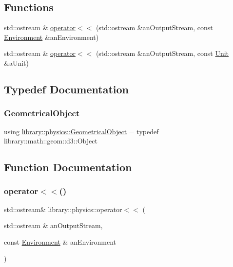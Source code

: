 \subsection*{Functions}
\begin{DoxyCompactItemize}
\item 
std\+::ostream \& \hyperlink{namespacelibrary_1_1physics_a3786f2dadc91182f9f027bf75bb186ce}{operator$<$$<$} (std\+::ostream \&an\+Output\+Stream, const \hyperlink{classlibrary_1_1physics_1_1_environment}{Environment} \&an\+Environment)
\item 
std\+::ostream \& \hyperlink{namespacelibrary_1_1physics_aca17d48f0effeaf867bfdf923ea80576}{operator$<$$<$} (std\+::ostream \&an\+Output\+Stream, const \hyperlink{classlibrary_1_1physics_1_1_unit}{Unit} \&a\+Unit)
\end{DoxyCompactItemize}


\subsection{Typedef Documentation}
\mbox{\label{namespacelibrary_1_1physics_a188a48c84b083aea628a2bd98f6b8e0a}} 
\subsubsection{\texorpdfstring{Geometrical\+Object}{GeometricalObject}}
{\footnotesize\ttfamily using \hyperlink{namespacelibrary_1_1physics_a188a48c84b083aea628a2bd98f6b8e0a}{library\+::physics\+::\+Geometrical\+Object} = typedef library\+::math\+::geom\+::d3\+::\+Object}



\subsection{Function Documentation}
\mbox{\label{namespacelibrary_1_1physics_a3786f2dadc91182f9f027bf75bb186ce}} 
\subsubsection{\texorpdfstring{operator$<$$<$()}{operator<<()}\hspace{0.1cm}{\footnotesize\ttfamily [1/2]}}
{\footnotesize\ttfamily std\+::ostream\& library\+::physics\+::operator$<$$<$ (\begin{DoxyParamCaption}\item[{std\+::ostream \&}]{an\+Output\+Stream,  }\item[{const \hyperlink{classlibrary_1_1physics_1_1_environment}{Environment} \&}]{an\+Environment }\end{DoxyParamCaption})}


